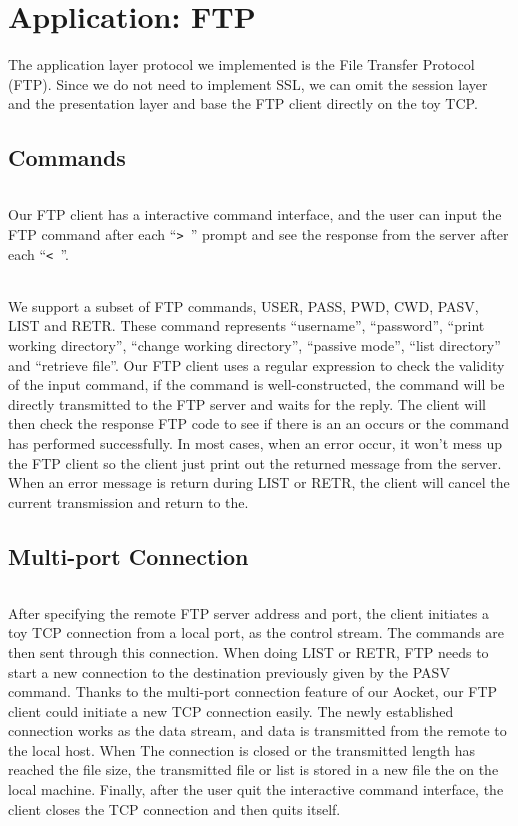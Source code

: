 \chapter{Application: FTP}\label{ch:ch6label}

The application layer protocol we implemented is the File Transfer Protocol (FTP). Since we do not need to implement SSL, we can omit the session layer and the presentation layer and base the FTP client directly on the toy TCP.

\section{Commands}
    \subparagraph{}
    Our FTP client has a interactive command interface, and the user can input the FTP command after each ``{\tt > }'' prompt and see the response from the server after each ``{\tt < }''.
    \subparagraph{}
    We support a subset of FTP commands, USER, PASS, PWD, CWD, PASV, LIST and RETR.  These command represents ``username'', ``password'', ``print working directory'', ``change working directory'', ``passive mode'', ``list directory'' and ``retrieve file''. Our FTP client uses a regular expression to check the validity of the input command, if the command is well-constructed, the command will be directly transmitted to the FTP server and waits for the reply. The client will then check the response FTP code to see if there is an an occurs or the command has performed successfully. In most cases, when an error occur, it won't mess up the FTP client so the client just print out the returned message from the server. When an error message is return during LIST or RETR, the client will cancel the current transmission and return to the.

\section{Multi-port Connection}\label{sec:ftpsynch}
    \subparagraph{}
    After specifying the remote FTP server address and port, the client initiates a toy TCP connection from a local port, as the control stream. The commands are then sent through this connection. When doing LIST or RETR, FTP needs to start a new connection to the destination previously given by the PASV command. Thanks to the multi-port connection feature of our Aocket, our FTP client could initiate a new TCP connection easily. The newly established connection works as the data stream, and data is transmitted from the remote to the local host. When The connection is closed or the transmitted length has reached the file size, the transmitted file or list is stored in a new file the on the local machine. Finally, after the user quit the interactive command interface, the client closes the TCP connection and then quits itself.
